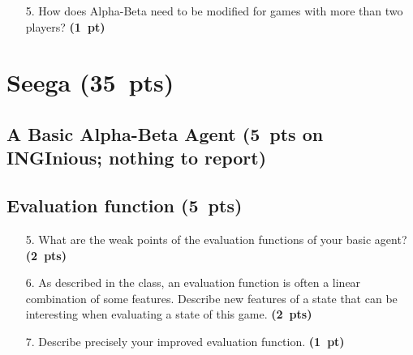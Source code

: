 \documentclass[11pt,a4paper]{report}
\begin{document}
\begin{enumerate}
\item[5.] How does Alpha-Beta need to be modified for games with more than two players? \textbf{(1~pt)}
\end{enumerate}

\begin{answers}[11cm]
\end{answers}





\clearpage
\section{Seega (35~pts)}
\medskip

\subsection{A Basic Alpha-Beta Agent (5~pts on INGInious; nothing to report)}
\medskip


\subsection{Evaluation function (5~pts)}

\begin{enumerate}
\item[5.] What are the weak points of the evaluation functions of your basic agent? \textbf{(2~pts)}
\end{enumerate}

\begin{answers}[19cm]
\end{answers}


\clearpage
\begin{enumerate}
\item[6.] As described in the class, an evaluation function is often a linear combination of
some features. Describe new features of a state that can be interesting when evaluating a state of this game. \textbf{(2~pts)}
\end{enumerate}

\begin{answers}[20cm]
\end{answers}



\clearpage
\begin{enumerate}
\item[7.] Describe precisely your improved evaluation function. \textbf{(1~pt)}
\end{enumerate}
\end{document}
